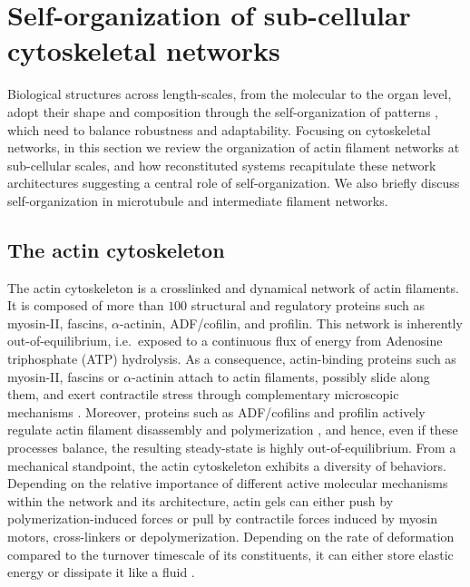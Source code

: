 \section{Self-organization of sub-cellular cytoskeletal networks}

Biological structures across length-scales, from the molecular to the organ level, adopt their shape and composition through the self-organization of patterns \cite{isaeva2012,sekimura2013}, which need to balance robustness and adaptability. Focusing on cytoskeletal networks, in this section we review the organization of actin filament networks at sub-cellular scales, and how reconstituted systems recapitulate these network architectures suggesting a central role of self-organization. We also briefly discuss self-organization in microtubule and intermediate filament networks.


\subsection{The actin cytoskeleton}

The actin cytoskeleton is a crosslinked and dynamical network of actin filaments. It is composed of more than $100$ structural and regulatory proteins  \cite{kelkar2020, chugh2018, thomas2012} such as myosin-II, fascins, $\alpha$-actinin, ADF/cofilin, and profilin. This network is inherently out-of-equilibrium, i.e.~exposed to a continuous flux of energy from  Adenosine triphosphate (ATP) hydrolysis. As a consequence, actin-binding proteins such as myosin-II, fascins or $\alpha$-actinin attach to actin filaments, possibly slide along them, and exert contractile stress through complementary microscopic mechanisms \cite{murrell2015, lenz2012, koenderink2018}. Moreover, proteins such as ADF/cofilins and profilin actively regulate actin filament disassembly  and polymerization \cite{rosenblatt1997, murrell2015,krishnan2009}, and hence, even if these processes balance, the resulting steady-state is highly out-of-equilibrium. From a mechanical standpoint, the actin cytoskeleton exhibits a diversity of behaviors. Depending on the relative importance of different active molecular mechanisms within the network and its architecture, actin gels can either push by polymerization-induced forces or pull by contractile forces induced by myosin motors, cross-linkers or depolymerization. Depending on the rate of deformation compared to the turnover timescale of its constituents, it can either store elastic energy or dissipate it like a fluid \cite{kollmannsberger2011}.

